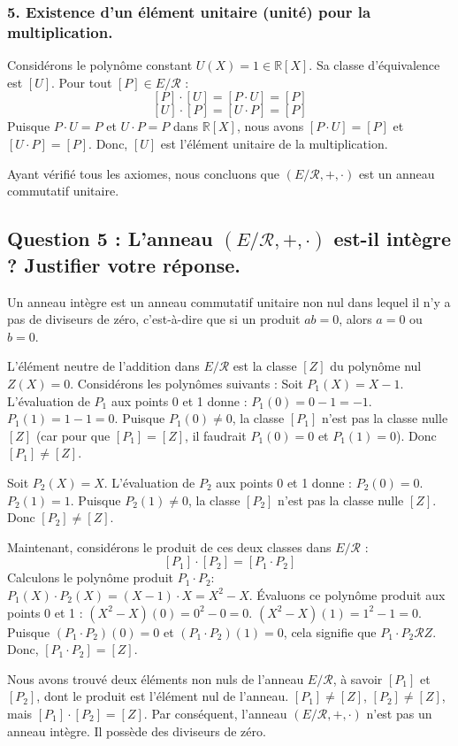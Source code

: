 \documentclass{report}
\begin{document}
\subsubsection*{5. Existence d'un élément unitaire (unité) pour la multiplication.}
Considérons le polynôme constant $U(X) = 1 \in \mathbb{R}[X]$. Sa classe d'équivalence est $[U]$.
Pour tout $[P] \in E/\mathcal{R}$ :
$$[P] \cdot [U] = [P \cdot U] = [P]$$
$$[U] \cdot [P] = [U \cdot P] = [P]$$
Puisque $P \cdot U = P$ et $U \cdot P = P$ dans $\mathbb{R}[X]$, nous avons $[P \cdot U]=[P]$ et $[U \cdot P]=[P]$.
Donc, $[U]$ est l'élément unitaire de la multiplication.

Ayant vérifié tous les axiomes, nous concluons que $(E/\mathcal{R}, +, \cdot)$ est un anneau commutatif unitaire.

\subsection*{Question 5 : L'anneau $(E/\mathcal{R}, +, \cdot)$ est-il intègre ? Justifier votre réponse.}

Un anneau intègre est un anneau commutatif unitaire non nul dans lequel il n'y a pas de diviseurs de zéro, c'est-à-dire que si un produit $ab=0$, alors $a=0$ ou $b=0$.

L'élément neutre de l'addition dans $E/\mathcal{R}$ est la classe $[Z]$ du polynôme nul $Z(X)=0$.
Considérons les polynômes suivants :
Soit $P_1(X) = X-1$.
L'évaluation de $P_1$ aux points 0 et 1 donne :
$P_1(0) = 0-1 = -1$.
$P_1(1) = 1-1 = 0$.
Puisque $P_1(0) \neq 0$, la classe $[P_1]$ n'est pas la classe nulle $[Z]$ (car pour que $[P_1]=[Z]$, il faudrait $P_1(0)=0$ et $P_1(1)=0$). Donc $[P_1] \neq [Z]$.

Soit $P_2(X) = X$.
L'évaluation de $P_2$ aux points 0 et 1 donne :
$P_2(0) = 0$.
$P_2(1) = 1$.
Puisque $P_2(1) \neq 0$, la classe $[P_2]$ n'est pas la classe nulle $[Z]$. Donc $[P_2] \neq [Z]$.

Maintenant, considérons le produit de ces deux classes dans $E/\mathcal{R}$ :
$$[P_1] \cdot [P_2] = [P_1 \cdot P_2]$$
Calculons le polynôme produit $P_1 \cdot P_2$:
$P_1(X) \cdot P_2(X) = (X-1) \cdot X = X^2 - X$.
Évaluons ce polynôme produit aux points 0 et 1 :
$(X^2-X)(0) = 0^2 - 0 = 0$.
$(X^2-X)(1) = 1^2 - 1 = 0$.
Puisque $(P_1 \cdot P_2)(0) = 0$ et $(P_1 \cdot P_2)(1) = 0$, cela signifie que $P_1 \cdot P_2 \mathcal{R} Z$.
Donc, $[P_1 \cdot P_2] = [Z]$.

Nous avons trouvé deux éléments non nuls de l'anneau $E/\mathcal{R}$, à savoir $[P_1]$ et $[P_2]$, dont le produit est l'élément nul de l'anneau.
$[P_1] \neq [Z]$, $[P_2] \neq [Z]$, mais $[P_1] \cdot [P_2] = [Z]$.
Par conséquent, l'anneau $(E/\mathcal{R}, +, \cdot)$ n'est pas un anneau intègre. Il possède des diviseurs de zéro.
\end{document}
